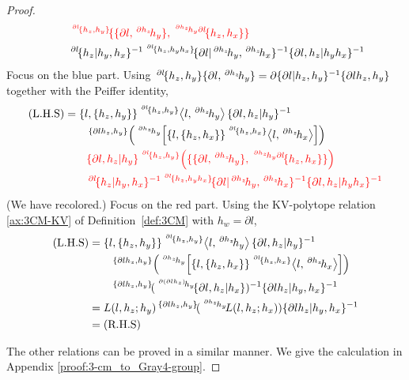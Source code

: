 \documentclass[11pt, reqno]{amsart} %
\newcommand{\act}[1]{\,\sp{#1}\!}
\newcommand{\red}[1]{\textcolor{red}{#1}}
\theoremstyle{definition}
\theoremstyle{remark}
\numberwithin{equation}{section}
\begin{document}
\begin{proof}
\begin{align*}
  &\qquad \red{\act{\act{\partial l}\{h_z,h_y\}}\{\{\partial l,\act{\partial h_z}h_y\},\act{\act{\partial h_z}h_y\partial l}\{h_z,h_x\}\}} \\
  &\qquad \act{\partial l}\{h_z|h_y,h_x\}^{-1}\act{\act{\partial l}\{h_z,h_yh_x\}}\{\partial l|\act{\partial h_z}h_y,\act{\partial h_z}h_x\}^{-1}\{\partial l,h_z|h_yh_x\}^{-1}
\end{align*}
Focus on the blue part. Using $\act{\partial l}\{h_z,h_y\}\{\partial l,\act{\partial h_z}h_y\} = \partial\{\partial l|h_z,h_y\}^{-1}\{\partial lh_z,h_y\}$ together with the Peiffer identity,
\begin{align*}
  (\text{L.H.S}) &= \{l,\{h_z,h_y\}\}\act{\act{\partial l}\{h_z,h_y\}}\left<l,\act{\partial h_z}h_y\right>\{\partial l,h_z|h_y\}^{-1} \\
  &\qquad \act{\{\partial lh_z,h_y\}}\left(\act{\act{\partial h_z}h_y}\left[\{l,\{h_z,h_x\}\}\act{\act{\partial l}\{h_z,h_x\}}\left<l,\act{\partial h_z}h_x\right>\right]\right) \\
  &\qquad \red{\{\partial l,h_z|h_y\}\act{\act{\partial l}\{h_z,h_y\}}\left(\{\{\partial l,\act{\partial h_z}h_y\},\act{\act{\partial h_z}h_y\partial l}\{h_z,h_x\}\}\right)} \\
  &\qquad \red{\act{\partial l}\{h_z|h_y,h_x\}^{-1}\act{\act{\partial l}\{h_z,h_yh_x\}}\{\partial l|\act{\partial h_z}h_y,\act{\partial h_z}h_x\}^{-1}\{\partial l,h_z|h_yh_x\}^{-1}}
\end{align*}
(We have recolored.) Focus on the red part. Using the KV-polytope relation \ref{ax:3CM-KV} of Definition~\ref{def:3CM} with $h_w = \partial l$, 
\begin{align*}
  (\text{L.H.S}) &= \{l,\{h_z,h_y\}\}\act{\act{\partial l}\{h_z,h_y\}}\left<l,\act{\partial h_z}h_y\right>\{\partial l,h_z|h_y\}^{-1} \\
  &\qquad \act{\{\partial lh_z,h_y\}}\left(\act{\act{\partial h_z}h_y}\left[\{l,\{h_z,h_x\}\}\act{\act{\partial l}\{h_z,h_x\}}\left<l,\act{\partial h_z}h_x\right>\right]\right) \\
  &\qquad \act{\{\partial lh_z,h_y\}}(\act{\act{\partial (\partial lh_z)}h_y}\{\partial l,h_z|h_x\})^{-1}\{\partial lh_z|h_y,h_x\}^{-1} \\
  &= L(l,h_z;h_y)\act{\{\partial lh_z,h_y\}}(\act{\act{\partial h_z}h_y}L(l,h_z;h_x))\{\partial lh_z|h_y,h_x\}^{-1} \\
  &= \text{(R.H.S)}
\end{align*}

The other relations can be proved in a similar manner. We give the calculation in Appendix \ref{proof:3-cm_to_Gray4-group}.

\end{proof}
\end{document}
